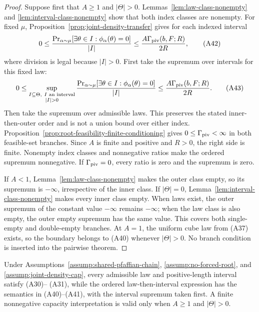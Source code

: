 \begin{proof}
Suppose first that $A\geq1$ and $|\Theta|>0$.
Lemmas~\ref{lem:law-class-nonempty} and
\ref{lem:interval-class-nonempty} show that both index classes are
nonempty.  For fixed $\mu$, Proposition~\ref{prop:joint-density-transfer}
gives for each indexed interval
\[
0\leq
\frac{\Pr_{\alpha\sim\mu}[\exists\theta\in I:
\phi_\alpha(\theta)=0]}{|I|}
\leq\frac{A\Gamma_{\rm piv}(b,F;R)}{2R},
\tag{A42}
\]
where division is legal because $|I|>0$.  First take the supremum over
intervals for this fixed law:
\[
0\leq
\sup_{\substack{I\subseteq\Theta,\ I\text{ an interval}\\|I|>0}}
\frac{\Pr_{\alpha\sim\mu}[\exists\theta\in I:
\phi_\alpha(\theta)=0]}{|I|}
\leq\frac{A\Gamma_{\rm piv}(b,F;R)}{2R}.
\tag{A43}
\]
Then take the supremum over admissible laws.  This preserves the stated
inner-then-outer order and is not a union bound over either index.
Proposition~\ref{prop:root-feasibility-finite-conditioning} gives
$0\leq\Gamma_{\rm piv}<\infty$ in both feasible-set branches.  Since $A$
is finite and positive and $R>0$, the right side is finite.  Nonempty index
classes and nonnegative ratios make the ordered supremum nonnegative.  If
$\Gamma_{\rm piv}=0$, every ratio is zero and the supremum is zero.

If $A<1$, Lemma~\ref{lem:law-class-nonempty} makes the outer class empty,
so its supremum is $-\infty$, irrespective of the inner class.  If
$|\Theta|=0$, Lemma~\ref{lem:interval-class-nonempty} makes every inner
class empty.  When laws exist, the outer supremum of the constant value
$-\infty$ remains $-\infty$; when the law class is also empty, the outer
empty supremum has the same value.  This covers both single-empty and
double-empty branches.  At $A=1$, the uniform cube law from
\textup{(A37)} exists, so the boundary belongs to \textup{(A40)} whenever
$|\Theta|>0$.  No branch condition is inserted into the pairwise theorem.
\end{proof}

\begin{proposition}
\label{prop:density-and-uniform-consequence}
Under Assumptions~\ref{assump:shared-pfaffian-chain},
\ref{assump:no-forced-root}, and \ref{assump:joint-density-cap}, every
admissible law and positive-length interval satisfy \textup{(A30)}--
\textup{(A31)}, while the ordered law-then-interval expression has the
semantics in \textup{(A40)}--\textup{(A41)}, with the interval supremum
taken first.  A finite nonnegative capacity interpretation is valid only
when $A\geq1$ and $|\Theta|>0$.
\end{proposition}


